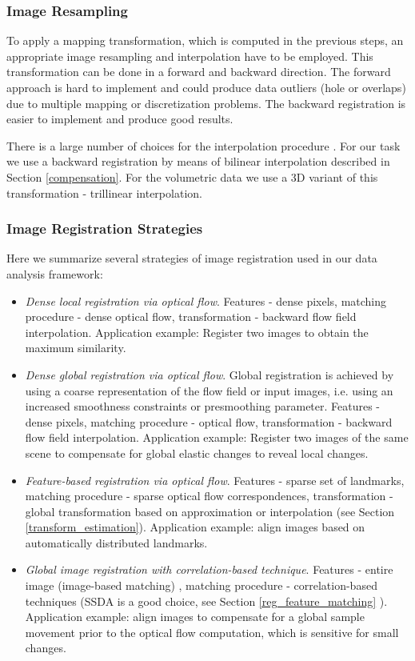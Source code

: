 \subsubsection{Image Resampling}

To apply a mapping transformation, which is computed in the previous steps, an appropriate image resampling and interpolation have to be employed. This transformation can be done in a forward and backward direction. The forward approach is hard to implement and could produce data outliers (hole or overlaps) due to multiple mapping or discretization problems. The backward registration is easier to implement and produce good results. 

There is a large number of choices for the interpolation procedure \cite{Parker83, Grevera98}. 
For our task we use a backward registration by means of bilinear interpolation described in Section \ref{compensation}. For the volumetric data we use a 3D variant of this transformation - trillinear interpolation.

\subsubsection{Image Registration Strategies}
\label{image_registration_strategies}


Here we summarize several strategies of image registration used in our data analysis framework:
\begin{itemize}
  \item \textit{Dense local registration via optical flow}. Features - dense pixels, matching procedure - dense optical flow,  transformation -  backward flow field interpolation. Application example: Register two images to obtain the maximum similarity. 
  \item \textit{Dense global registration via optical flow}. Global registration is achieved by using a coarse representation of the flow field or input images, i.e. using an increased smoothness constraints or presmoothing parameter. Features - dense pixels, matching procedure - optical flow, transformation - backward flow field interpolation. Application example: Register two images of the same scene to compensate for global elastic changes to reveal local changes. 
  \item \textit{Feature-based registration via optical flow}. Features - sparse set of landmarks, matching procedure - sparse optical flow correspondences, transformation - global transformation based  on approximation or interpolation (see Section \ref{transform_estimation}). Application example: align images based on automatically distributed landmarks.
  \item \textit{Global image registration with correlation-based technique}. Features - entire image (image-based matching) , matching procedure - correlation-based techniques (SSDA is a good choice, see Section \ref{reg_feature_matching} ).  Application example: align images to compensate for a global sample movement prior to the optical flow computation, which is sensitive for small changes.
\end{itemize}






